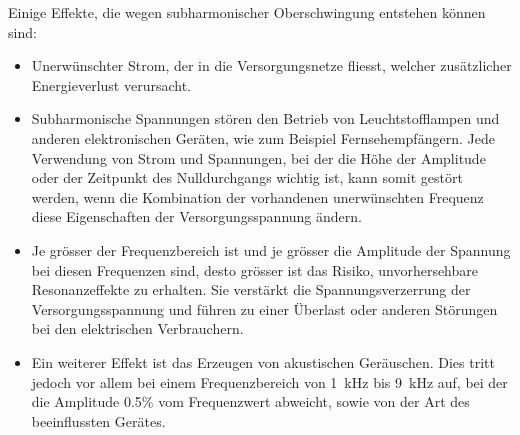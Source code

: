 Einige Effekte, die wegen subharmonischer Oberschwingung entstehen können sind:
\begin{itemize}
	\item Unerwünschter Strom, der in die Versorgungsnetze fliesst, welcher zusätzlicher Energieverlust verursacht.
	\item Subharmonische Spannungen stören den Betrieb von Leuchtstofflampen und anderen elektronischen Geräten, wie zum Beispiel Fernsehempfängern. Jede Verwendung von Strom und Spannungen, bei der die Höhe der Amplitude oder der Zeitpunkt des Nulldurchgangs wichtig ist, kann somit gestört werden, wenn die Kombination der vorhandenen unerwünschten Frequenz diese Eigenschaften der Versorgungsspannung ändern.
	\item Je grösser der Frequenzbereich ist und je grösser die Amplitude der Spannung bei diesen Frequenzen sind, desto grösser ist das Risiko, unvorhersehbare Resonanzeffekte zu erhalten. Sie verstärkt die Spannungsverzerrung der Versorgungsspannung und führen zu einer Überlast oder anderen Störungen bei den elektrischen Verbrauchern.
	\item Ein weiterer Effekt ist das Erzeugen von akustischen Geräuschen. Dies tritt jedoch vor allem bei einem Frequenzbereich von \SI{1}{kHz} bis \SI{9}{kHz} auf, bei der die Amplitude 0.5\% vom Frequenzwert abweicht, sowie von der Art des beeinflussten Gerätes.
\end{itemize}





        
